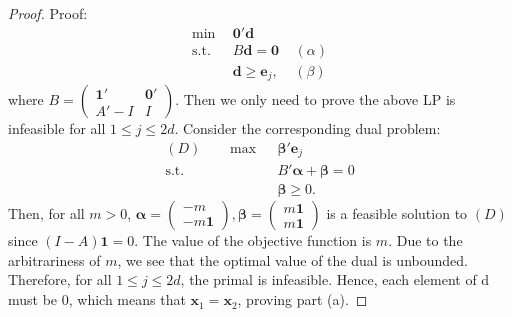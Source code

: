 \documentclass[final,11pt,3p]{article}\usepackage{setspace}
\begin{document}
\begin{proof}{Proof:}
\begin{align*}
\min ~~      &\boldsymbol{0}'\boldsymbol{d}      \\
\text{s.t.}~~ & B\boldsymbol{d} = \boldsymbol{0}  ~~~~~(\alpha)\\
& \boldsymbol{d} \ge \boldsymbol{e}_j, ~~~~~(\beta)
\end{align*}
where $B = \begin{pmatrix}\boldsymbol{1}' & \boldsymbol{0}'\\A' - I & I\end{pmatrix} $. Then we only need to prove the above LP is infeasible for all $ 1 \le j \le 2d$.
Consider the corresponding dual problem:
\begin{align*}
(D)~~~~~~~~ \max ~~      &\boldsymbol{\beta}'\boldsymbol{e}_j \\
\text{s.t.}~~ & B' \boldsymbol{\alpha} + \boldsymbol{\beta} = 0 \\
& \boldsymbol{\beta} \ge 0.
\end{align*}
Then, for all $m>0$, $\boldsymbol{\alpha} = \begin{pmatrix}-m \\-m\boldsymbol{1}\end{pmatrix}, \boldsymbol{\beta} = \begin{pmatrix} m\boldsymbol{1}\\ m\boldsymbol{1}\end{pmatrix}$ is a feasible solution to $(D)$ since $(I - A) \boldsymbol{1} = 0$. The value of the objective function is $m$. Due to the arbitrariness of $m$, we see that the optimal value of the dual is unbounded. Therefore, for all $1 \le j \le 2d$, the primal is infeasible. Hence, each element of d must be 0, which means that $\boldsymbol{x}_1 = \boldsymbol{x}_2$, proving part (a). {{}}


\end{proof}
\end{document}
